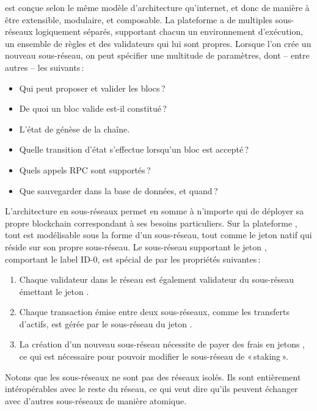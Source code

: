 \documentclass[runningheads,francais,a4paper]{llncs}
\begin{document}
\AVAPlatformName{} est conçue selon le même modèle d'architecture qu'internet, et donc de manière à être extensible,
modulaire, et composable. La plateforme \AVAPlatformName{} a de multiples sous-réseaux logiquement séparés, supportant
chacun un environnement d'exécution, un ensemble de règles et des validateurs qui lui sont propres. Lorsque l'on crée un nouveau
sous-réseau, on peut spécifier une multitude de paramètres, dont -- entre autres -- les suivants\,:
\begin{itemize}
\item{} Qui peut proposer et valider les blocs\,?
\item{} De quoi un bloc valide est-il constitué\,?
\item{} L'état de génèse de la chaîne.
\item{} Quelle transition d'état s'effectue lorsqu'un bloc est accepté\,?
\item{} Quels appels RPC sont supportés\,?
\item{} Que sauvegarder dans la base de données, et quand\,?
\end{itemize}
L'architecture en sous-réseaux permet en somme à n'importe qui de déployer sa propre blockchain correspondant à ses
besoins particuliers. Sur la plateforme \AVAPlatformName{}, tout est modélisable sous la forme d'un sous-réseau, tout
comme le jeton natif \AVATokenName{} qui réside sur son propre sous-réseau. Le sous-réseau supportant le jeton
\AVATokenName{}, comportant le label ID-0, est spécial de par les propriétés suivantes\,:
\begin{enumerate}
\item Chaque validateur dans le réseau \AVAPlatformName{} est également validateur du sous-réseau émettant le jeton
\AVATokenName{}.
\item Chaque transaction émise entre deux sous-réseaux, comme les transferts d'actifs, est gérée par le sous-réseau du
jeton \AVATokenName{}.
\item La création d'un nouveau sous-réseau nécessite de payer des frais en jetons \AVATokenName{}, ce qui est nécessaire
pour pouvoir modifier le sous-réseau de «\,staking\,».
\end{enumerate}
Notons que les sous-réseaux ne sont pas des réseaux isolés. Ils sont entièrement intéropérables avec le reste du réseau,
ce qui veut dire qu'ils peuvent échanger avec d'autres sous-réseaux de manière atomique.
\end{document}
